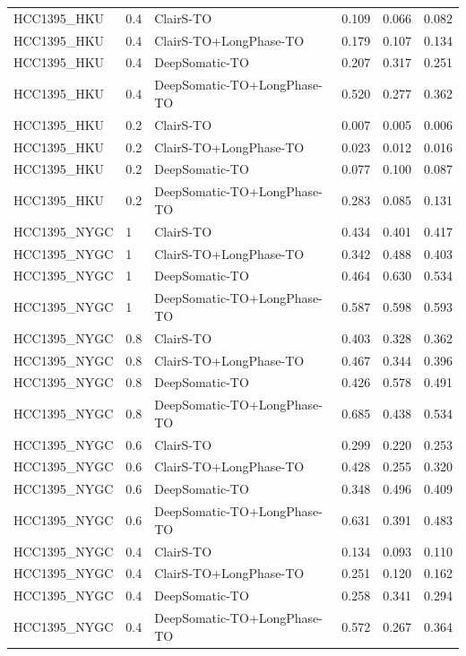 \documentclass[pdflatex,sn-nature]{sn-jnl}
\begin{document}
{\begin{longtable}{@{}lllccc@{}}
  HCC1395\_HKU & 0.4 & ClairS-TO & 0.109 & 0.066 & 0.082 \\
  HCC1395\_HKU & 0.4 & ClairS-TO+LongPhase-TO & 0.179 & 0.107 & 0.134 \\
  HCC1395\_HKU & 0.4 & DeepSomatic-TO & 0.207 & 0.317 & 0.251 \\
  HCC1395\_HKU & 0.4 & DeepSomatic-TO+LongPhase-TO & 0.520 & 0.277 & 0.362 \\
  HCC1395\_HKU & 0.2 & ClairS-TO & 0.007 & 0.005 & 0.006 \\
  HCC1395\_HKU & 0.2 & ClairS-TO+LongPhase-TO & 0.023 & 0.012 & 0.016 \\
  HCC1395\_HKU & 0.2 & DeepSomatic-TO & 0.077 & 0.100 & 0.087 \\
  HCC1395\_HKU & 0.2 & DeepSomatic-TO+LongPhase-TO & 0.283 & 0.085 & 0.131 \\
  HCC1395\_NYGC & 1 & ClairS-TO & 0.434 & 0.401 & 0.417 \\
  HCC1395\_NYGC & 1 & ClairS-TO+LongPhase-TO & 0.342 & 0.488 & 0.403 \\
  HCC1395\_NYGC & 1 & DeepSomatic-TO & 0.464 & 0.630 & 0.534 \\
  HCC1395\_NYGC & 1 & DeepSomatic-TO+LongPhase-TO & 0.587 & 0.598 & 0.593 \\
  HCC1395\_NYGC & 0.8 & ClairS-TO & 0.403 & 0.328 & 0.362 \\
  HCC1395\_NYGC & 0.8 & ClairS-TO+LongPhase-TO & 0.467 & 0.344 & 0.396 \\
  HCC1395\_NYGC & 0.8 & DeepSomatic-TO & 0.426 & 0.578 & 0.491 \\
  HCC1395\_NYGC & 0.8 & DeepSomatic-TO+LongPhase-TO & 0.685 & 0.438 & 0.534 \\
  HCC1395\_NYGC & 0.6 & ClairS-TO & 0.299 & 0.220 & 0.253 \\
  HCC1395\_NYGC & 0.6 & ClairS-TO+LongPhase-TO & 0.428 & 0.255 & 0.320 \\
  HCC1395\_NYGC & 0.6 & DeepSomatic-TO & 0.348 & 0.496 & 0.409 \\
  HCC1395\_NYGC & 0.6 & DeepSomatic-TO+LongPhase-TO & 0.631 & 0.391 & 0.483 \\
  HCC1395\_NYGC & 0.4 & ClairS-TO & 0.134 & 0.093 & 0.110 \\
  HCC1395\_NYGC & 0.4 & ClairS-TO+LongPhase-TO & 0.251 & 0.120 & 0.162 \\
  HCC1395\_NYGC & 0.4 & DeepSomatic-TO & 0.258 & 0.341 & 0.294 \\
  HCC1395\_NYGC & 0.4 & DeepSomatic-TO+LongPhase-TO & 0.572 & 0.267 & 0.364 \\

\end{longtable}}
\end{document}
